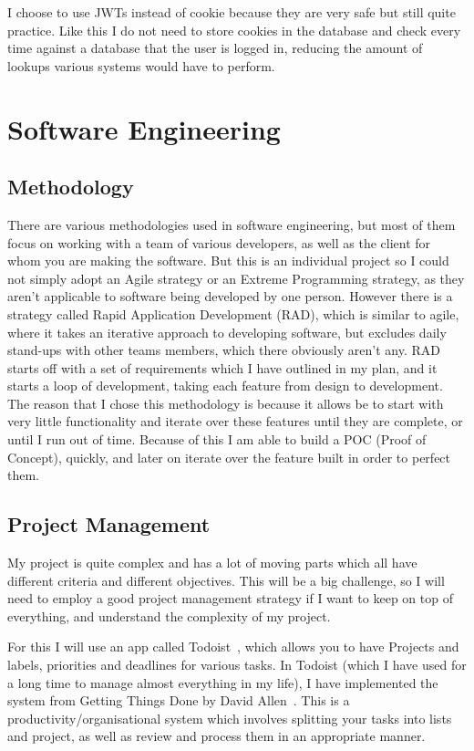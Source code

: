 \documentclass[titlepage]{article}
\begin{document}
I choose to use JWTs instead of cookie because they are very safe but still quite practice. Like this I do not need to store cookies in the database and check every time against a database that the user is logged in, reducing the amount of lookups various systems would have to perform.

\section{Software Engineering}

\subsection{Methodology}
There are various methodologies used in software engineering, but most of them focus on working with a team of various developers, as well as the client for whom you are making the software. But this is an individual project so I could not simply adopt an Agile strategy or an Extreme Programming strategy, as they aren't applicable to software being developed by one person. However there is a strategy called Rapid Application Development (RAD), which is similar to agile, where it takes an iterative approach to developing software, but excludes daily stand-ups with other teams members, which there obviously aren't any. RAD starts off with a set of requirements which I have outlined in my plan, and it starts a loop of development, taking each feature from design to development. The reason that I chose this methodology is because it allows be to start with very little functionality and iterate over these features until they are complete, or until I run out of time. Because of this I am able to build a POC (Proof of Concept), quickly, and later on iterate over the feature built in order to perfect them.

\subsection{Project Management}
My project is quite complex and has a lot of moving parts which all have different criteria and different objectives. This will be a big challenge, so I will need to employ a good project management strategy if I want to keep on top of everything, and understand the complexity of my project.

For this I will use an app called Todoist~\cite{todoist}, which allows you to have Projects and labels, priorities and deadlines for various tasks. In Todoist (which I have used for a long time to manage almost everything in my life), I have implemented the system from Getting Things Done by David Allen~\cite{gtd}. This is a productivity/organisational system which involves splitting your tasks into lists and project, as well as review and process them in an appropriate manner.
\end{document}
